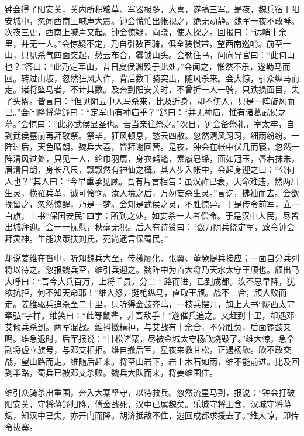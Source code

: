 钟会得了阳安关，关内所积粮草、军器极多，大喜，遂犒三军。是夜，魏兵宿于阳安城中，忽闻西南上喊声大震。钟会慌忙出帐视之，绝无动静。魏军一夜不敢睡。次夜三更，西南上喊声又起。钟会惊疑，向晓，使人探之。回报曰：“远哨十余里，并无一人。”会惊疑不定，乃自引数百骑，俱全装惯带，望西南巡哨。前至一山，只见杀气四面突起，愁云布合，雾锁山头。会勒住马，问向导官曰：“此何山也？”答曰：“此乃定军山，昔日夏侯渊殁于此处。”会闻之，怅然不乐，遂勒马而回。转过山坡，忽然狂风大作，背后数千骑突出，随风杀来。会大惊，引众纵马而走。诸将坠马者，不计其数。及奔到阳安关时，不曾折一人一骑，只跌损面目，失了头盔。皆言曰：“但见阴云中人马杀来，比及近身，却不伤人，只是一阵旋风而已。”会问降将蒋舒曰：“定军山有神庙乎？”舒曰：“并无神庙，惟有诸葛武侯之墓。”会惊曰：“此必武侯显圣也。吾当亲往祭之。”次日，钟会备祭礼，宰太牢，自到武侯墓前再拜致祭。祭毕，狂风顿息，愁云四散。忽然清风习习，细雨纷纷。一阵过后，天色晴朗。魏兵大喜，皆拜谢回营。是夜，钟会在帐中伏几而寝，忽然一阵清风过处，只见一人，纶巾羽扇，身衣鹤氅，素履皂绦，面如冠玉，唇若抹朱，眉清目朗，身长八尺，飘飘然有神仙之概。其人步入帐中，会起身迎之曰：“公何人也？”其人曰：“今早重承见顾。吾有片言相告：虽汉祚已衰，天命难违，然两川生灵，横罹兵革，诚可怜悯。汝入境之后，万勿妄杀生灵。”言讫，拂袖而去。会欲挽留之，忽然惊醒，乃是一梦。会知是武侯之灵，不胜惊异。于是传令前军，立一白旗，上书“保国安民”四字；所到之处，如妄杀一人者偿命。于是汉中人民，尽皆出城拜迎。会一一抚慰，秋毫无犯。后人有诗赞曰：“数万阴兵绕定军，致令钟会拜灵神。生能决策扶刘氏，死尚遗言保蜀民。”

却说姜维在沓中，听知魏兵大至，传檄廖化、张翼、董厥提兵接应；一面自分兵列将以待之。忽报魏兵至，维引兵迎之。魏阵中为首大将乃天水太守王颀也。颀出马大呼曰：“吾今大兵百万，上将千员，分二十路而进，已到成都。汝不思早降，犹欲抗拒，何不知天命耶！”维大怒，挺枪纵马，直取王颀。战不三合，颀大败而走。姜维驱兵追杀至二十里，只听得金鼓齐鸣，一枝兵摆开，旗上大书“陇西太守牵弘”字样。维笑曰：“此等鼠辈，非吾敌手！”遂催兵追之。又赶到十里，却遇邓艾倾兵杀到。两军混战。维抖擞精神，与艾战有十余合，不分胜负，后面锣鼓又鸣。维急退时，后军报说：“甘松诸寨，尽被金城太守杨欣烧毁了。”维大惊，急令副将虚立旗号，与邓艾相拒。维自撤后军，星夜来救甘松，正遇杨欣。欣不敢交战，望山路而走。维随后赶来。将至山岩下，岩上木石如雨，维不能前进。比及回到半路，蜀兵已被邓艾杀败。魏兵大队而来，将姜维围住。

维引众骑杀出重围，奔入大寨坚守，以待救兵。忽然流星马到，报说：“钟会打破阳安关，守将蒋舒归降，傅佥战死，汉中已属魏矣。乐城守将王含，汉城守将蒋斌，知汉中已失，亦开门而降。胡济抵敌不住，逃回成都求援去了。”维大惊，即传令拔寨。

